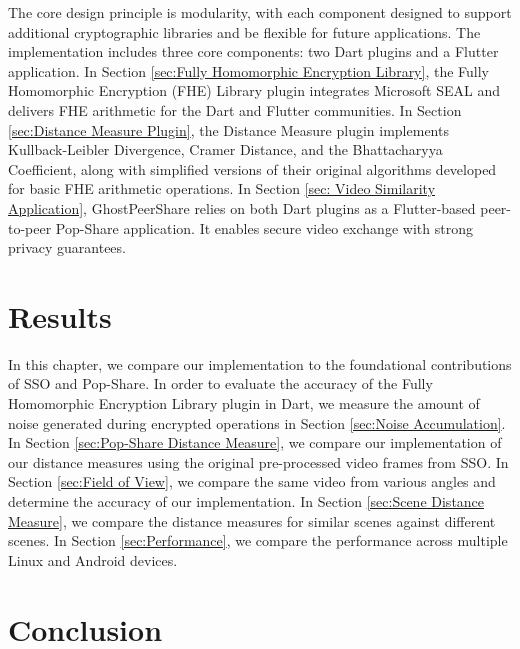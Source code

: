 \documentclass [11pt, proquest] {uwthesis}[2020/02/24]
\begin{document}
The core design principle is modularity, with each component designed to support additional cryptographic libraries and be flexible for future applications. The implementation includes three core components: two Dart plugins and a Flutter application. In Section \ref{sec:Fully Homomorphic Encryption Library}, the Fully Homomorphic Encryption (FHE) Library plugin integrates Microsoft SEAL and delivers FHE arithmetic for the Dart and Flutter communities. In Section \ref{sec:Distance Measure Plugin}, the Distance Measure plugin implements Kullback-Leibler Divergence, Cramer Distance, and the Bhattacharyya Coefficient, along with simplified versions of their original algorithms developed for basic FHE arithmetic operations. In Section \ref{sec: Video Similarity Application}, GhostPeerShare relies on both Dart plugins as a Flutter-based peer-to-peer Pop-Share application. It enables secure video exchange with strong privacy guarantees.






\chapter{Results}

In this chapter, we compare our implementation to the foundational contributions of SSO and Pop-Share. In order to evaluate the accuracy of the Fully Homomorphic Encryption Library plugin in Dart, we measure the amount of noise generated during encrypted operations in Section \ref{sec:Noise Accumulation}. In Section \ref{sec:Pop-Share Distance Measure}, we compare our implementation of our distance measures using the original pre-processed video frames from SSO. In Section \ref{sec:Field of View}, we compare the same video from various angles and determine the accuracy of our implementation. In Section \ref{sec:Scene Distance Measure}, we compare the distance measures for similar scenes against different scenes. In Section \ref{sec:Performance}, we compare the performance across multiple Linux and Android devices.








\chapter{Conclusion}

\end{document}
